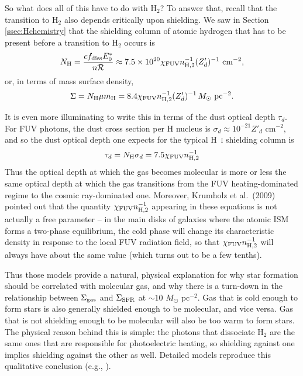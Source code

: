 So what does all of this have to do with H$_2$? To answer that, recall that the transition to H$_2$ also depends critically upon shielding. We saw in Section \ref{ssec:Hchemistry} that the shielding column of atomic hydrogen that has to be present before a transition to H$_2$ occurs is
\begin{equation}
N_{\rm H} = \frac{c f_{\rm diss} E_0^*}{n \mathcal{R}} \approx 7.5\times 10^{20} \chi_{\rm FUV} n_{\rm H,2}^{-1} (Z'_d)^{-1}\mbox{ cm}^{-2},
\end{equation}
or, in terms of mass surface density,
\begin{equation}
\Sigma = N_{\rm H} \mu m_{\rm H} = 8.4 \chi_{\rm FUV} n_{\rm H,2}^{-1} (Z'_d)^{-1}\,M_\odot\mbox{ pc}^{-2}.
\end{equation}

It is even more illuminating to write this in terms of the dust optical depth $\tau_d$. For FUV photons, the dust cross section per H nucleus is $\sigma_d \approx 10^{-21} Z'_d$ cm$^{-2}$, and so the dust optical depth one expects for the typical H~\textsc{i} shielding column is
\begin{equation}
\tau_d = N_{\rm H} \sigma_d = 7.5 \chi_{\rm FUV} n_{\rm H,2}^{-1}
\end{equation}
Thus the optical depth at which the gas becomes molecular is more or less the same optical depth at which the gas transitions from the FUV heating-dominated regime to the cosmic ray-dominated one. Moreover, Krumholz et al.~(2009) pointed out that the quantity $\chi_{\rm FUV} n_{\rm H,2}^{-1}$ appearing in these equations is not actually a free parameter -- in the main disks of galaxies where the atomic ISM forms a two-phase equilibrium, the cold phase will change its characteristic density in response to the local FUV radiation field, so that $\chi_{\rm FUV} n_{\rm H,2}^{-1}$ will always have about the same value (which turns out to be a few tenths).

Thus those models provide a natural, physical explanation for why star formation should be correlated with molecular gas, and why there is a turn-down in the relationship between $\Sigma_{\rm gas}$ and $\Sigma_{\rm SFR}$ at $\sim 10$ $M_\odot$ pc$^{-2}$. Gas that is cold enough to form stars is also generally shielded enough to be molecular, and vice versa. Gas that is not shielding enough to be molecular will also be too warm to form stars. The physical reason behind this is simple: the photons that dissociate H$_2$ are the same ones that are responsible for photoelectric heating, so shielding against one implies shielding against the other as well. Detailed models reproduce this qualitative conclusion (e.g., \citealt{krumholz11b}).

